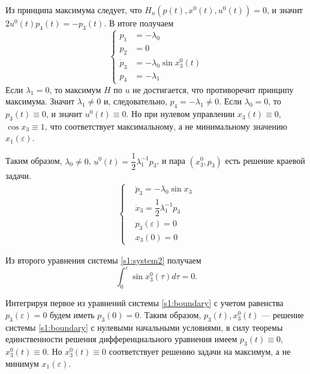 \documentclass[../main.tex]{subfiles}
\begin{document}
Из принципа максимума следует, что
$H_u(p(t),x^0(t),u^0(t))=0$, и значит $2u^0(t)p_4(t)=-p_3(t)$.
В итоге получаем
\begin{equation*}
		\left\{ \begin{aligned}
						p_1 &= -\lambda_0\\
						p_2 &= 0\\
						\dot{p}_3 &= -\lambda_0 \sin x_3^0(t)\\
						p_4 &= -\lambda_1
		\end{aligned} \right.
\end{equation*}
Если $ \lambda_1 = 0 $, то максимум $ H $ по $ u $ не достигается, что противоречит принципу максимума. 
Значит $ \lambda_1 \neq 0 $ и, следовательно, $p_4=-\lambda_1 \neq 0$. 
Если $ \lambda_0 = 0 $, то $ p_3(t) \equiv 0 $, и значит $ u^0(t) \equiv 0 $. 
Но при нулевом управлении $ x_3(t) \equiv 0 $, $ \cos x_3 \equiv 1 $, что соответствует максимальному, а не минимальному значению $ x_1(\varepsilon) $.


Таким образом, $ \lambda_0 \neq 0 $, $ u^0(t) = \dfrac{1}{2}\lambda_1^{-1}p_3 $, и пара $ (x_3^0,p_3) $ есть решение краевой задачи.
\begin{gather}\label{s1:boundary}
		\left\{ \begin{aligned}
		& \dot{p}_3 = -\lambda_0 \sin x_3\\
		& \dot{x}_3 = \dfrac{1}{2}\lambda_1^{-1}p_3\\
		& p_3(\varepsilon) = 0 \\
		& x_3(0) = 0
		\end{aligned} \right.
\end{gather}

Из второго уравнения системы \eqref{s1:system2} получаем
\begin{equation*}
	\int_0^\varepsilon \sin x_3^0(\tau) d\tau = 0.
\end{equation*}

Интегрируя первое из уравнений системы \eqref{s1:boundary} с учетом равенства $ p_3(\varepsilon) = 0 $ будем иметь $ p_3(0) = 0 $. 
Таким образом, $ p_3(t), x_3^0(t) $ --- решение системы \eqref{s1:boundary} с нулевыми начальными условиями, в силу теоремы единственности решения дифференциального уравнения имеем $ p_3(t) \equiv 0$, $ x_3^0(t) \equiv 0 $. 
Но $ x_3^0(t) \equiv 0 $ соответствует решению задачи на максимум, а не минимум $ x_1(\varepsilon) $.
\end{document}
